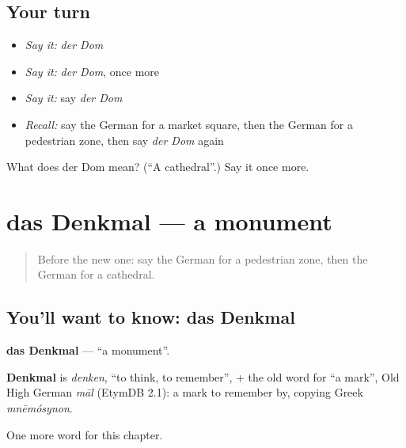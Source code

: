 \subsection*{Your turn}
\begin{itemize}
\raggedright
  \item \emph{Say it:} \emph{der Dom}
  \item \emph{Say it:} \emph{der Dom}, once more
  \item \emph{Say it:} say \emph{der Dom}
  \item \emph{Recall:} say the German for a market square, then the German for a pedestrian zone, then say \emph{der Dom} again
\end{itemize}

\begin{tcolorbox}[breakable,colback=teal!4,colframe=teal!35!black,title={Before you move on}]
What does der Dom mean? (\textquotedblleft{}A cathedral\textquotedblright{}.) Say it once more.
\end{tcolorbox}
\section[das Denkmal]{das Denkmal — a monument}

\label{lesson:GE-C195-denkmal}



\begin{quote}
Before the new one: say the German for a pedestrian zone, then the German for a cathedral.
\end{quote}

\subsection*{You'll want to know: das Denkmal}
\textbf{das Denkmal} — \textquotedblleft{}a monument\textquotedblright{}.

\begin{cousinweb}
\textbf{Denkmal} is \emph{denken}, \textquotedblleft{}to think, to remember\textquotedblright{}, + the old word for \textquotedblleft{}a mark\textquotedblright{}, Old High German \emph{māl} (EtymDB 2.1): a mark to remember by, copying Greek \emph{mnēmósynon}.
\end{cousinweb}

\begin{grammarlens}[title={What you've built}]
One more word for this chapter.
\end{grammarlens}

